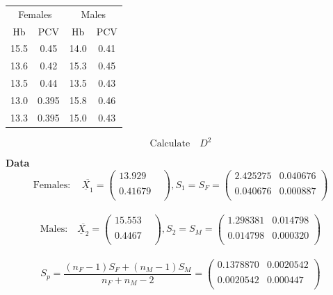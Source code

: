 \documentclass[11pt,a4paper]{article}
\theoremstyle{definition}
\begin{document}
\begin{table}[H]
\centering
\begin{tabular}{cccc}
\multicolumn{2}{c}{Females} & \multicolumn{2}{c}{Males}\\
Hb   &  PCV & Hb &  PCV\\
15.5 & 0.45 & 14.0 & 0.41\\
13.6 & 0.42 & 15.3 & 0.45\\
13.5 & 0.44 & 13.5 & 0.43\\
13.0 & 0.395& 15.8  & 0.46\\
13.3 & 0.395&15.0  & 0.43\\
\end{tabular}
\end{table}

$$\text{Calculate}\quad  D^2$$


\textbf{Data}\\
$$\text{Females}:\quad  \overline{\underline{X}_1}=
\begin{pmatrix}
13.929\\
&\\
0.41679\\
\end{pmatrix}
, 
S_1 = S_F=
\begin{pmatrix}
2.425275 & 0.040676\\
&\\
0.040676 & 0.000887\\
\end{pmatrix}
$$\\



$$\text{Males:}\quad  \overline{\underline{X}_2}=
\begin{pmatrix}
15.553\\
&\\
0.4467\\
\end{pmatrix}
, 
S_2 = S_M =
\begin{pmatrix}
1.298381 & 0.014798\\
&\\
0.014798 & 0.000320\\
\end{pmatrix}
$$\\




$$S_p = \frac{(n_F-1)S_F + (n_M-1)S_M}{n_F + n_M -2}=
\begin{pmatrix}
0.1378870 & 0.0020542\\
&\\
0.0020542 & 0.000447\\
\end{pmatrix}
$$\\
\end{document}
